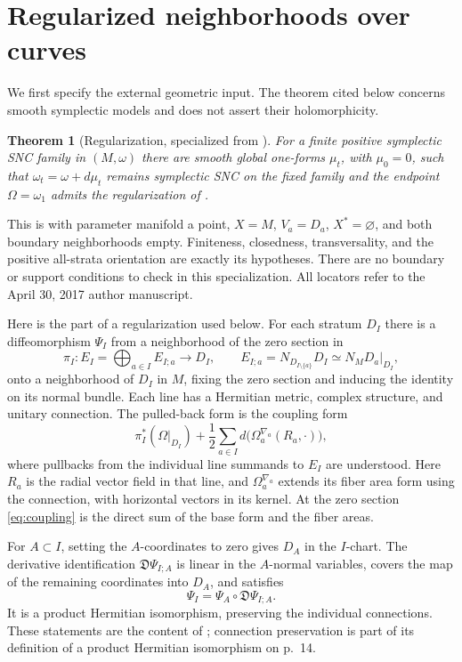 \documentclass[11pt]{article}
\newtheorem{theorem}{Theorem}[section]
\theoremstyle{definition}
\theoremstyle{remark}
\begin{document}
\section{Regularized neighborhoods over curves}\label{sec:curves}

We first specify the external geometric input. The theorem cited below concerns smooth symplectic models and does not assert their holomorphicity.

\begin{theorem}[Regularization, specialized from \cite{TMZ}]\label{thm:regularization}
For a finite positive symplectic SNC family in $(M,\omega)$ there are smooth global one-forms $\mu_t$, with $\mu_0=0$, such that $\omega_t=\omega+d\mu_t$ remains symplectic SNC on the fixed family and the endpoint $\Omega=\omega_1$ admits the regularization of \cite[Definition 2.12(1)]{TMZ}.
\end{theorem}
This is \cite[Theorem 2.13, p.~17]{TMZ} with parameter manifold a point, $X=M$, $V_a=D_a$, $X^*=\varnothing$, and both boundary neighborhoods empty. Finiteness, closedness, transversality, and the positive all-strata orientation are exactly its hypotheses. There are no boundary or support conditions to check in this specialization. All locators refer to the April 30, 2017 author manuscript.

Here is the part of a regularization used below. For each stratum $D_I$ there is a diffeomorphism $\Psi_I$ from a neighborhood of the zero section in
\[
 \pi_I:E_I=\bigoplus_{a\in I} E_{I;a}\longrightarrow D_I,
 \qquad E_{I;a}=N_{D_{I\setminus\{a\}}}D_I\simeq N_MD_a|_{D_I},
\]
onto a neighborhood of $D_I$ in $M$, fixing the zero section and inducing the identity on its normal bundle. Each line has a Hermitian metric, complex structure, and unitary connection. The pulled-back form is the coupling form
\begin{equation}\label{eq:coupling}
 \pi_I^*(\Omega|_{D_I})+
 \frac12\sum_{a\in I}d\bigl(\Omega_a^{\nabla_a}(R_a,\cdot)\bigr),
\end{equation}
where pullbacks from the individual line summands to $E_I$ are understood. Here $R_a$ is the radial vector field in that line, and $\Omega_a^{\nabla_a}$ extends its fiber area form using the connection, with horizontal vectors in its kernel. At the zero section \eqref{eq:coupling} is the direct sum of the base form and the fiber areas.

For $A\subset I$, setting the $A$-coordinates to zero gives $D_A$ in the $I$-chart. The derivative identification $\mathfrak D\Psi_{I;A}$ is linear in the $A$-normal variables, covers the map of the remaining coordinates into $D_A$, and satisfies
\begin{equation}\label{eq:composition}
 \Psi_I=\Psi_A\circ\mathfrak D\Psi_{I;A}.
\end{equation}
It is a product Hermitian isomorphism, preserving the individual connections. These statements are the content of \cite[Definitions 2.8--2.12, equations (2.10)--(2.17)]{TMZ}; connection preservation is part of its definition of a product Hermitian isomorphism on p.~14.
\end{document}
